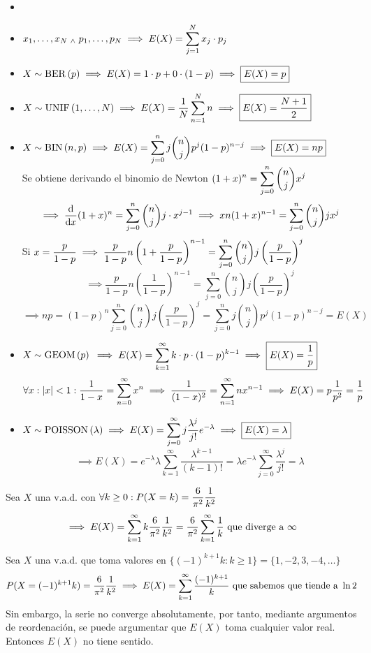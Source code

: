 \begin{ejem}
	\begin{itemize}[topsep=1pt, itemsep=1pt,parsep=3pt]
		\item[]
		\item $\displaystyle x_1, \dots, x_N \; _{\wedge} \; p_1, \dots, p_N \implies E(X)=\sum_{j=1}^N x_j\cdot p_j$
		\item $\displaystyle X\sim\operatorname{BER}\left(p\right) \implies E(X)=1\cdot p+0\cdot(1-p)\implies \boxed{E(X)=p}$
		\item $\displaystyle X\sim\operatorname{UNIF}\left(1, \dots, N\right) \implies E(X)=\frac{1}{N}\sum_{n=1}^N n \implies \boxed{E(X)=\frac{N+1}{2}}$
		\item $\displaystyle X\sim\operatorname{BIN}\left(n, p\right) \implies E(X)=\sum_{j=0}^n j\binom{n}{j}p^j(1-p)^{n-j}\implies \boxed{E(X)=np}$ \\
		      Se obtiene derivando el binomio de Newton $\displaystyle (1+x)^n=\sum_{j=0}^n \binom{n}{j} x^j$
		      \[\implies \odv{}{x}(1+x)^n=\sum_{j=0}^n \binom{n}{j} j\cdot x^{j-1} \implies xn(1+x)^{n-1}=\sum_{j=0}^n \binom{n}{j} jx^{j}\]
		      Si $\displaystyle x=\frac{p}{1-p} \implies
			      \frac{p}{1-p}n\left(1+\frac{p}{1-p}\right)^{n-1}=\sum_{j=0}^n \binom{n}{j}
			      j\left(\frac{p}{1-p}\right)^{j}$
		      \[\implies \frac{p}{1-p}n\left(\frac{1}{1-p}\right)^{n-1}=\sum_{j=0}^n \binom{n}{j} j\left(\frac{p}{1-p}\right)^{j}\]
		      \[\implies np=(1-p)^n\sum_{j=0}^n \binom{n}{j} j\left(\frac{p}{1-p}\right)^{j} = \sum_{j=0}^n j\binom{n}{j}p^j(1-p)^{n-j} = E(X)\]
		      \hfill \qedsymbol
		\item $X\sim \operatorname{GEOM}\left(p\right)$ $\displaystyle \implies E(X)=\sum_{k=1}^\infty k\cdot p\cdot(1-p)^{k-1} \implies \boxed{E(X)=\frac{1}{p}}$
		      \[\forall  x :\left|x\right|<1: \frac{1}{1-x}=\sum_{n=0}^\infty x^n\implies \frac{1}{(1-x)^2}=\sum_{n=1}^\infty nx^{n-1}\implies E(X)= p \frac{1}{p^2}=\frac{1}{p}\]
		      \hfill \qedsymbol
		\item $\displaystyle X\sim\operatorname{POISSON}\left(\lambda\right) \implies E(X)=\sum_{j=0}^\infty j\frac{\lambda^j}{j!}e^{-\lambda}\implies \boxed{E(X)=\lambda}$
		      \[\implies E(X)=e^{-\lambda}\lambda\sum_{k=1}^\infty \frac{\lambda^{k-1}}{(k-1)!}=\lambda e^{-\lambda}\sum_{j=0}^{\infty} \frac{\lambda^j}{j!}=\lambda\]
		      \hfill \qedsymbol
	\end{itemize}
\end{ejem}

\begin{ejem}
	Sea $X$ una v.a.d. con $\displaystyle \forall k \geq 0 : P(X=k)=\frac{6}{\pi^2}\frac{1}{k^2}$
	\[\implies E(X)=\sum_{k=1}^\infty k\frac{6}{\pi^2}\frac{1}{k^2}=\frac{6}{\pi^2}\sum_{k=1}^\infty \frac{1}{k} \text{  que diverge a } \infty\]
\end{ejem}
\begin{ejem}
	Sea $X$ una v.a.d. que toma valores en $\{(-1)^{k+1}k : k \geq 1\} = \{1, -2, 3, -4, \dots\}$
	\[P(X=(-1)^{k+1}k)=\frac{6}{\pi^2}\frac{1}{k^2} \implies E(X)=\sum_{k=1}^\infty \frac{(-1)^{k+1}}{k} \text{ que sabemos que tiende a } \ln{2}\]
	Sin embargo, la serie no converge absolutamente, por tanto, mediante argumentos
	de reordenación, se puede argumentar que $E(X)$ toma cualquier valor real.
	Entonces $E(X)$ no tiene sentido.
\end{ejem}

